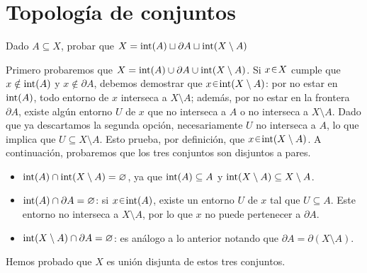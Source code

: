 
\section{Topología de conjuntos}

\begin{ejer}
Dado $A\subseteq X$, probar que
\(
    X=\operatorname{int}(A)\sqcup\partial A\sqcup\operatorname{int}(X\setminus A)
\)
\end{ejer}
\begin{sol}[Demostración]
Primero probaremos que $X = \operatorname{int}(A) \cup \partial A \cup \operatorname{int}(X \setminus A)$. Si $x \en X$ cumple que $x \notin \operatorname{int}(A)$ y $x \notin \partial A$, debemos demostrar que $x \en \inter(X \setminus A)$: por no estar en $\operatorname{int}(A)$, todo entorno de $x$ interseca a $X \setminus A$; además, por no estar en la frontera $\partial A$, existe algún entorno $U$ de $x$ que no interseca a $A$ o no interseca a $X \setminus A$. Dado que ya descartamos la segunda opción, necesariamente $U$ no interseca a $A$, lo que implica que $U \subseteq X \setminus A$. Esto prueba, por definición, que $x \en \inter(X \setminus A)$.
A continuación, probaremos que los tres conjuntos son disjuntos a pares.
\begin{itemize}
    \item $\operatorname{int}(A) \cap \operatorname{int}(X \setminus A) = \varnothing$, ya que $\operatorname{int}(A) \subseteq A$ y $\operatorname{int}(X \setminus A) \subseteq X \setminus A$.
    \item $\operatorname{int}(A) \cap \partial A = \varnothing$: si $x \en \inter(A)$, existe un entorno $U$ de $x$ tal que $U \subseteq A$. Este entorno no interseca a $X \setminus A$, por lo que $x$ no puede pertenecer a $\partial A$.
    \item $\operatorname{int}(X \setminus A) \cap \partial A = \varnothing$: es análogo a lo anterior notando que $\partial A = \partial(X \setminus A)$.
\end{itemize}
Hemos probado que $X$ es unión disjunta de estos tres conjuntos.
\end{sol}

